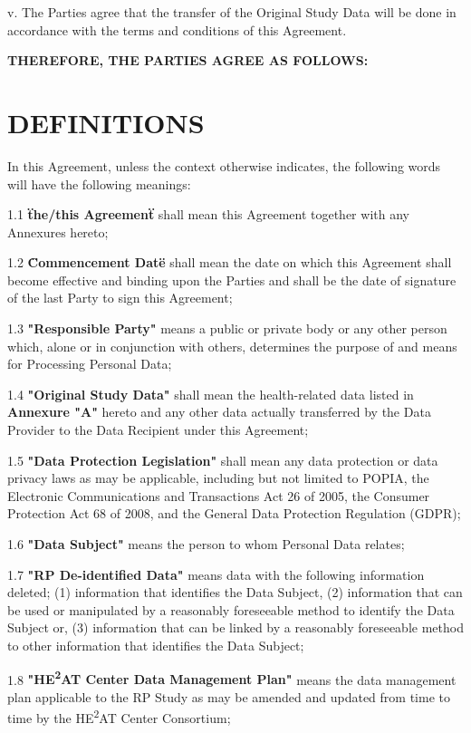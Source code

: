 v. The Parties agree that the transfer of the Original Study Data will be done in accordance with the terms and conditions of this Agreement.

\textbf{THEREFORE, THE PARTIES AGREE AS FOLLOWS:}

\section{DEFINITIONS}

In this Agreement, unless the context otherwise indicates, the following words will have the following meanings:

1.1 \textbf{\"the/this Agreement\"} shall mean this Agreement together with any Annexures hereto;

1.2 \textbf{\"Commencement Date\"} shall mean the date on which this Agreement shall become effective and binding upon the Parties and shall be the date of signature of the last Party to sign this Agreement;

1.3 \textbf{"Responsible Party"} means a public or private body or any other person which, alone or in conjunction with others, determines the purpose of and means for Processing Personal Data;

1.4 \textbf{"Original Study Data"} shall mean the health-related data listed in \textbf{Annexure "A"} hereto and any other data actually transferred by the Data Provider to the Data Recipient under this Agreement;

1.5 \textbf{"Data Protection Legislation"} shall mean any data protection or data privacy laws as may be applicable, including but not limited to POPIA, the Electronic Communications and Transactions Act 26 of 2005, the Consumer Protection Act 68 of 2008, and the General Data Protection Regulation (GDPR);

1.6 \textbf{"Data Subject"} means the person to whom Personal Data relates;

1.7 \textbf{"RP De-identified Data"} means data with the following information deleted; (1) information that identifies the Data Subject, (2) information that can be used or manipulated by a reasonably foreseeable method to identify the Data Subject or, (3) information that can be linked by a reasonably foreseeable method to other information that identifies the Data Subject;

1.8 \textbf{"HE\textsuperscript{2}AT Center Data Management Plan"} means the data management plan applicable to the RP Study as may be amended and updated from time to time by the HE\textsuperscript{2}AT Center Consortium;

